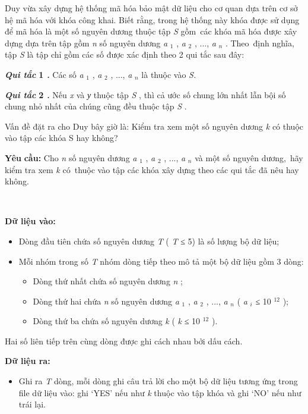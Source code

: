 

Duy vừa xây dựng hệ thống mã hóa bảo mật dữ liệu cho cơ quan dựa trên cơ sở hệ mã hóa với khóa công khai. Biết rằng, trong hệ thống này khóa được sử dụng để mã hóa là một số nguyên dương thuộc tập \emph{ S } gồm các khóa mã hóa được xây dựng dựa trên tập gồm \emph{ n } số nguyên dương \emph{ a }$_ 1 $ , \emph{ a }$_ 2 $ , ..., \emph{ a }\emph{$_ n $} . Theo định nghĩa, tập \emph{ S } là tập chỉ gồm các số được xác định theo 2 qui tắc sau đây:

\textbf{\emph{Qui tắc }}\textbf{ 1 \emph{ . }} Các số \emph{ a }$_ 1 $ , \emph{ a }$_ 2 $ , ..., \emph{ a }\emph{$_ n $} là thuộc vào \emph{ S. }

\textbf{\emph{Qui tắc }}\textbf{ 2 \emph{ . }} Nếu \emph{ x } và \emph{ у } thuộc tập \emph{ S } , thì cả ước số chung lớn nhất lẫn bội số chung nhỏ nhất của chúng cũng đều thuộc tập \emph{ S } .

Vấn đề đặt ra cho Duy bây giờ là: Kiểm tra xem một số nguyên dương \emph{ k } có thuộc vào tập các khóa S \emph{} hay không?

\textbf{Yêu }\textbf{}\textbf{ cầu: }\textbf{} Cho \emph{ n } số nguyên dương \emph{ a }$_ 1 $ , \emph{ a }$_ 2 $ , ..., \emph{ a }\emph{$_ n $} và một số nguyên dương, hãy kiểm tra xem \emph{ k } có thuộc vào tập các khóa xây dựng theo các qui tắc đã nêu hay không.

 

\textbf{Dữ liệu vào: }
\begin{itemize}
	\item Dòng đầu tiên chứa số nguyên dương \emph{ T } ( \emph{ T }\emph{} ≤ 5) là số lượng bộ dữ liệu;
	\item Mỗi nhóm trong số \emph{ T } nhóm dòng tiếp theo mô tả một bộ dữ liệu gồm 3 dòng:
\begin{itemize}
	\item Dòng thứ nhất chứa số nguyên dương \emph{ n } ;
	\item Dòng thứ hai chứa \emph{ n } số nguyên dương \emph{ a }$_ 1 $ , \emph{ a }$_ 2 $ , ..., \emph{ a }\emph{$_ n $}\emph{} ( \emph{ a }\emph{$_ i $}\emph{} ≤ 10 $^ 12 $ );
	\item Dòng thứ ba chứa số nguyên dương \emph{ k } ( \emph{ k } ≤ 10 $^ 12 $ ).
\end{itemize}
\end{itemize}

Hai số liên tiếp trên cùng dòng được ghi cách nhau bởi dấu cách.

\textbf{Dữ liệu ra:}
\begin{itemize}
	\item Ghi ra \emph{ T } dòng, mỗi dòng ghi câu trả lời cho một bộ dữ liệu tương ứng trong file dữ liệu vào: ghi ‘YES’ nếu như \emph{ k } thuộc vào tập khóa và ghi ‘NO’ nếu như trái lại.
\end{itemize}

